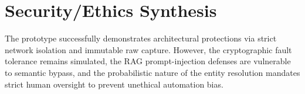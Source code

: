 \section{Security/Ethics Synthesis}
\label{sec:sec-synthesis}
The prototype successfully demonstrates architectural protections via strict network isolation and immutable raw capture. 
However, the cryptographic fault tolerance remains simulated, the RAG prompt-injection defenses are vulnerable to 
semantic bypass, and the probabilistic nature of the entity resolution mandates strict human oversight to prevent 
unethical automation bias.
